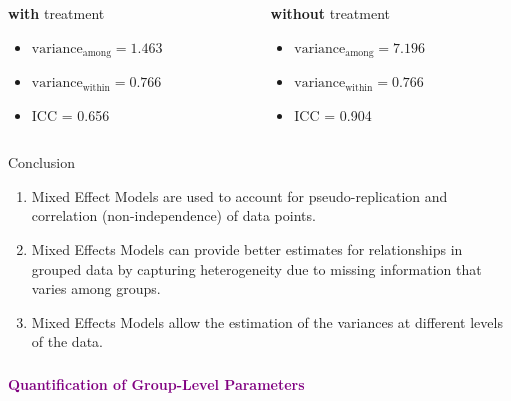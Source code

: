 \documentclass{beamer}
\begin{document}
\begin{frame}[fragile]
  \begin{columns}[onlytextwidth] 
  \begin{column}{0.5\textwidth}
  \textbf{with} treatment \\
  \begin{itemize}
      \item $\text{variance}_{\text{among}} = 1.463$
      \item $\text{variance}_{\text{within}} = 0.766$ 
      \item ICC =  0.656
  \end{itemize}

  \end{column}
    \hspace{0.02\textwidth} %
    \begin{column}{0.5\textwidth}
    \textbf{without} treatment
    \begin{itemize}
      \item $\text{variance}_{\text{among}} = 7.196$
      \item $\text{variance}_{\text{within}} = 0.766$ 
      \item ICC =   0.904
  \end{itemize}
    \end{column}
  \end{columns}

\end{frame}

\begin{frame}{Conclusion}
  \begin{enumerate}
      \item Mixed Effect Models are used to account for pseudo-replication and correlation (non-independence) of data points.
      \item Mixed Effects Models can provide better estimates for relationships in grouped data by capturing heterogeneity due to missing information that varies among groups.
      \item Mixed Effects Models allow the estimation of the variances at different levels of the data.
    \end{enumerate}
\end{frame}


\begin{frame}
  \frametitle{}
  \begin{center}
    \huge\textbf{\textcolor{purple}{Quantification of Group-Level Parameters}}
  \end{center}
\end{frame}
\end{document}
